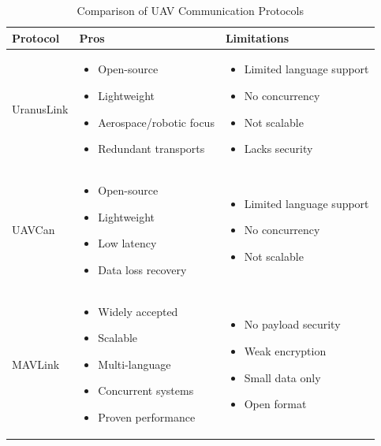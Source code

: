 \begin{table}[H]
\centering
\label{tab:uav_protocol_comparison}
\renewcommand{\arraystretch}{1.0} %
\begin{tabular}{|>{\centering\arraybackslash}m{3cm}|
                >{\arraybackslash}m{6cm}|
                >{\arraybackslash}m{6cm}|}
\hline
\textbf{Protocol} & \textbf{Pros} & \textbf{Limitations} \\ 
\hline
UranusLink & 
\begin{itemize}
    \item Open-source
    \item Lightweight
    \item Aerospace/robotic focus
    \item Redundant transports
\end{itemize} & 
\begin{itemize}
    \item Limited language support
    \item No concurrency
    \item Not scalable
    \item Lacks security
\end{itemize} \\ 
\hline
UAVCan & 
\begin{itemize}
    \item Open-source
    \item Lightweight
    \item Low latency
    \item Data loss recovery
\end{itemize} & 
\begin{itemize}
    \item Limited language support
    \item No concurrency
    \item Not scalable
\end{itemize} \\ 
\hline
MAVLink & 
\begin{itemize}
    \item Widely accepted
    \item Scalable
    \item Multi-language
    \item Concurrent systems
    \item Proven performance
\end{itemize} & 
\begin{itemize}
    \item No payload security
    \item Weak encryption
    \item Small data only
    \item Open format
\end{itemize} \\ 
\hline
\end{tabular}
\caption{Comparison of UAV Communication Protocols}
\end{table}






